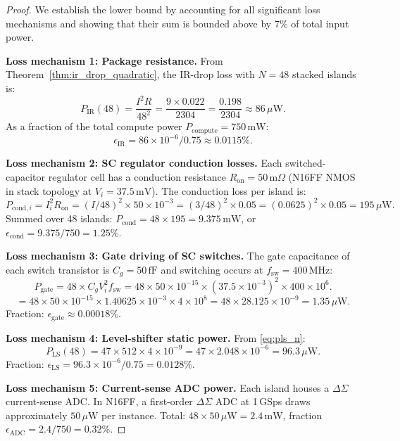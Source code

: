 \begin{proof}
We establish the lower bound by accounting for all significant loss mechanisms
and showing that their sum is bounded above by 7\% of total input power.

\textbf{Loss mechanism 1: Package resistance.}
From Theorem~\ref{thm:ir_drop_quadratic}, the IR-drop loss with $N = 48$
stacked islands is:
\[
  P_{\mathrm{IR}}(48) = \frac{I^2 R}{48^2}
  = \frac{9 \times 0.022}{2304} = \frac{0.198}{2304} \approx 86\,\mu\mathrm{W}.
\]
As a fraction of the total compute power $P_{\mathrm{compute}} = 750\,\mathrm{mW}$:
\[
  \epsilon_{\mathrm{IR}} = 86 \times 10^{-6} / 0.75 \approx 0.0115\%. \tag{E1}
\]

\textbf{Loss mechanism 2: SC regulator conduction losses.}
Each switched-capacitor regulator cell has a conduction resistance
$R_{\mathrm{on}} = 50\,\mathrm{m}\Omega$ (N16FF NMOS in stack topology at $V_i
= 37.5\,\mathrm{mV}$).  The conduction loss per island is:
\[
  P_{\mathrm{cond},i} = I_i^2 R_{\mathrm{on}} = (I/48)^2 \times 50 \times 10^{-3}
  = (3/48)^2 \times 0.05 = (0.0625)^2 \times 0.05 = 195\,\mu\mathrm{W}.
\]
Summed over 48 islands: $P_{\mathrm{cond}} = 48 \times 195 = 9.375\,\mathrm{mW}$,
or $\epsilon_{\mathrm{cond}} = 9.375/750 = 1.25\%$. 

\textbf{Loss mechanism 3: Gate driving of SC switches.}
The gate capacitance of each switch transistor is $C_g = 50\,\mathrm{fF}$ and
switching occurs at $f_{\mathrm{sw}} = 400\,\mathrm{MHz}$:
\[
  P_{\mathrm{gate}} = 48 \times C_g V_i^2 f_{\mathrm{sw}}
  = 48 \times 50 \times 10^{-15} \times (37.5 \times 10^{-3})^2
    \times 400 \times 10^6.
\]
\[
  = 48 \times 50 \times 10^{-15} \times 1.40625 \times 10^{-3}
    \times 4 \times 10^8
  = 48 \times 28.125 \times 10^{-9}
  = 1.35\,\mu\mathrm{W}.
\]
Fraction: $\epsilon_{\mathrm{gate}} \approx 0.00018\%$. 

\textbf{Loss mechanism 4: Level-shifter static power.}
From \eqref{eq:pls_n}:
\[
  P_{\mathrm{LS}}(48) = 47 \times 512 \times 4 \times 10^{-9}
  = 47 \times 2.048 \times 10^{-6} = 96.3\,\mu\mathrm{W}.
\]
Fraction: $\epsilon_{\mathrm{LS}} = 96.3 \times 10^{-6} / 0.75 = 0.0128\%$. 

\textbf{Loss mechanism 5: Current-sense ADC power.}
Each island houses a $\Delta\Sigma$ current-sense ADC.  In N16FF, a
first-order $\Delta\Sigma$ ADC at 1\,GSps draws approximately $50\,\mu\mathrm{W}$
per instance.  Total: $48 \times 50\,\mu\mathrm{W} = 2.4\,\mathrm{mW}$,
fraction $\epsilon_{\mathrm{ADC}} = 2.4/750 = 0.32\%$. 


\end{proof}
